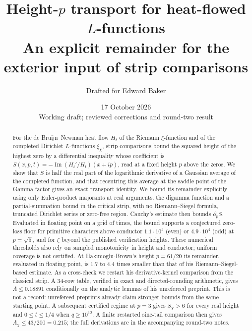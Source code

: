 \documentclass[11pt]{article}
\title{Height-$p$ transport for heat-flowed $L$-functions\\[2pt]
\large An explicit remainder for the exterior input of strip comparisons}
\author{Drafted for Edward Baker}
\date{17 October 2026\\\small Working draft; reviewed corrections and round-two result}
\theoremstyle{definition}
\theoremstyle{remark}
\newcommand{\im}{\operatorname{Im}}
\numberwithin{equation}{section}
\begin{document}
\maketitle
\begin{abstract}
For the de Bruijn--Newman heat flow $H_t$ of the Riemann $\xi$-function and
of the completed Dirichlet $L$-functions $\xi_\chi$, strip comparisons
bound the squared height of the highest zero by a differential inequality
whose coefficient is $S(x,p,t)=-\im(H_t'/H_t)(x+ip)$, read at a fixed
height $p$ above the zeros. We show that $S$ is half the real part of the
logarithmic derivative of a Gaussian average of the completed function,
and that recentring this average at the saddle point of the Gamma factor
gives an exact transport identity. We bound its remainder explicitly
using only Euler-product majorants at real arguments, the digamma function
and a partial-summation bound in the critical strip, with no
Riemann--Siegel formula, truncated Dirichlet series or zero-free region.
Cauchy's estimate then bounds $\partial_pS$. Evaluated in floating point
on a grid of times, the bound supports a conjectured zero-loss floor for
primitive characters above conductor $1.1\cdot10^5$ (even) or
$4.9\cdot10^4$ (odd) at $p=\sqrt5$, and for $\zeta$ beyond the published
verification heights. These numerical thresholds also rely on sampled
monotonicity in height and conductor; uniform coverage is not certified. At Hakimoglu-Brown's height $p=61/20$ its remainder,
evaluated in floating point, is $1.7$ to $4.4$ times smaller than that of
his Riemann--Siegel-based estimate. As
a cross-check we restart his derivative-kernel comparison from the
classical strip. A 34-row table, verified in exact and directed-rounding
arithmetic, gives $\Lambda\le0.18891$ conditionally on the analytic lemmas
of his unrefereed preprint. This is not a record: unrefereed preprints
already claim stronger bounds from the same starting point.
A subsequent certified regime at $p=3$ gives $S_\chi>6$ for every real
height and $0\le t\le1/4$ when $q\ge10^{12}$. A finite restarted
sine-tail comparison then gives $\Lambda_\chi\le43/200=0.215$;
the full derivations are in the accompanying round-two notes.
\end{abstract}
\end{document}
